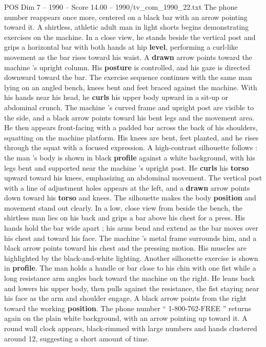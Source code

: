 \begin{textsample}{POS Dim 7 – 1990 – Score 14.00 – 1990/tv\_com\_1990\_22.txt}
The phone number reappears once more, centered on a black bar with an arrow pointing toward it.
A shirtless, athletic adult man in light shorts begins demonstrating exercises on the machine.
In a close view, he stands beside the vertical post and grips a horizontal bar with both hands at hip \textbf{level}, performing a curl-like movement as the bar rises toward his waist.
A \textbf{drawn} arrow points toward the machine ’s upright column.
His \textbf{posture} is controlled, and his gaze is directed downward toward the bar.
The exercise sequence continues with the same man lying on an angled bench, knees bent and feet braced against the machine.
With his hands near his head, he \textbf{curls} his upper body upward in a sit-up or abdominal crunch.
The machine ’s curved frame and upright post are visible to the side, and a black arrow points toward his bent legs and the movement area.
He then appears front-facing with a padded bar across the back of his shoulders, squatting on the machine platform.
His knees are bent, feet planted, and he rises through the squat with a focused expression.
A high-contrast silhouette follows : the man ’s body is shown in black \textbf{profile} against a white background, with his legs bent and supported near the machine ’s upright post.
He \textbf{curls} his \textbf{torso} upward toward his knees, emphasizing an abdominal movement.
The vertical post with a line of adjustment holes appears at the left, and a \textbf{drawn} arrow points down toward his \textbf{torso} and knees.
The silhouette makes the body \textbf{position} and movement stand out clearly.
In a low, close view from beside the bench, the shirtless man lies on his back and grips a bar above his chest for a press.
His hands hold the bar wide apart ; his arms bend and extend as the bar moves over his chest and toward his face.
The machine ’s metal frame surrounds him, and a black arrow points toward his chest and the pressing motion.
His muscles are highlighted by the black-and-white lighting.
Another silhouette exercise is shown in \textbf{profile}.
The man holds a handle or bar close to his chin with one fist while a long resistance arm angles back toward the machine on the right.
He leans back and lowers his upper body, then pulls against the resistance, the fist staying near his face as the arm and shoulder engage.
A black arrow points from the right toward the working \textbf{position}.
The phone number “ 1-800-762-FREE ” returns again on the plain white background, with an arrow pointing up toward it.
A round wall clock appears, black-rimmed with large numbers and hands clustered around 12, suggesting a short amount of time.

\end{textsample}
